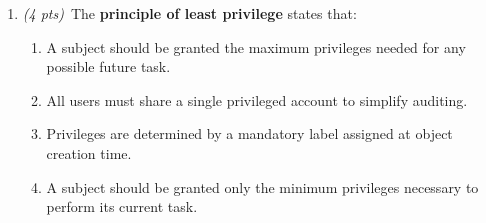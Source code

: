\documentclass[11pt]{article}
\newcommand{\correctchoice}[1]{\ifanswers\textcolor{keygreen}{\textbf{#1}}\else #1\fi}
\newcommand{\wrongchoice}[1]{\ifanswers\textcolor{keygrey}{#1}\else #1\fi}
\newif\ifanswers
\begin{document}
\begin{enumerate}
\item \textit{(4 pts)}~The \textbf{principle of least privilege} states that:
  \begin{enumerate}[label=(\alph*)]
    \item \wrongchoice{A subject should be granted the maximum privileges needed for any possible future task.}
    \item \wrongchoice{All users must share a single privileged account to simplify auditing.}
    \item \wrongchoice{Privileges are determined by a mandatory label assigned at object creation time.}
    \item \correctchoice{A subject should be granted only the minimum privileges necessary to perform its current task.}
  \end{enumerate}
  \ifanswers \par\smallskip\textcolor{keyred}{\textbf{Answer:} d}
    Least privilege limits the damage a compromised process or user can cause.
    (a) violates the principle; (b) is the opposite of good practice;
    (c) describes mandatory access control labels, not least privilege.\par\smallskip\fi

\end{enumerate}
\end{document}
